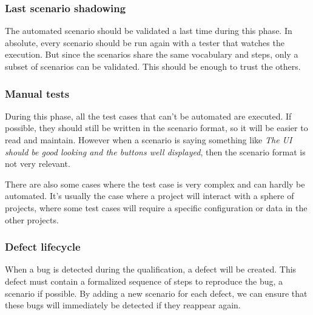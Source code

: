 \subsubsection{Last scenario shadowing}
The automated scenario should be validated a last time during this phase.
In absolute, every scenario should be run again with a tester that watches
the execution.
But since the scenarios share the same vocabulary and steps, only a subset of
scenarios can be validated.
This should be enough to trust the others.

\subsubsection{Manual tests}
During this phase, all the test cases that can't be automated are executed.
If possible, they should still be written in the scenario format, so it will
be easier to read and maintain.
However when a scenario is saying something like \textit{The UI should be good
looking and the buttons well displayed}, then the scenario format is not very
relevant.

There are also some cases where the test case is very complex and can hardly
be automated.
It's usually the case where a project will interact with a sphere of
projects, where some test cases will require a specific configuration or data
in the other projects.

\subsubsection{Defect lifecycle}
When a bug is detected during the qualification, a defect will be created.
This defect must contain a formalized sequence of steps to reproduce the bug,
a scenario if possible.
By adding a new scenario for each defect, we can ensure that these bugs will
immediately be detected if they reappear again.
